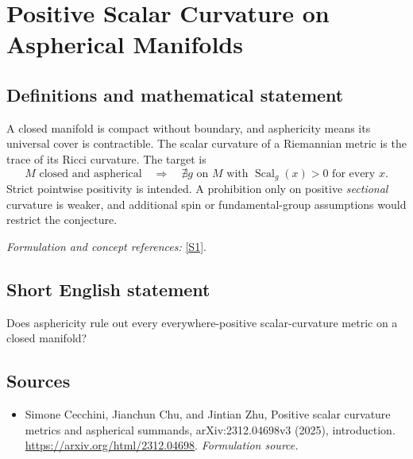 \documentclass[11pt]{article}
\begin{document}
\section*{\texorpdfstring{Positive Scalar Curvature on Aspherical Manifolds}{Positive Scalar Curvature on Aspherical Manifolds}}\label{30005870}
\subsection{Definitions and mathematical statement}
A closed manifold is compact without boundary, and asphericity means its universal cover is contractible. The scalar curvature of a Riemannian metric is the trace of its Ricci curvature. The target is
\[
 M\text{ closed and aspherical}\quad\Longrightarrow\quad
 \nexists g\text{ on }M\text{ with }\operatorname{Scal}_g(x)>0\text{ for every }x.
\]
Strict pointwise positivity is intended. A prohibition only on positive \emph{sectional} curvature is weaker, and additional spin or fundamental-group assumptions would restrict the conjecture.
\par\smallskip\textit{Formulation and concept references:} \href{https://arxiv.org/html/2312.04698}{[S1]}.

\subsection{Short English statement}
Does asphericity rule out every everywhere-positive scalar-curvature metric on a closed manifold?
\subsection{Sources}
\begin{itemize}
\item[S1]Simone Cecchini, Jianchun Chu, and Jintian Zhu, Positive scalar curvature metrics and aspherical summands, arXiv:2312.04698v3 (2025), introduction.
\url{https://arxiv.org/html/2312.04698}.
\textit{Formulation source.}
\end{itemize}
\end{document}
